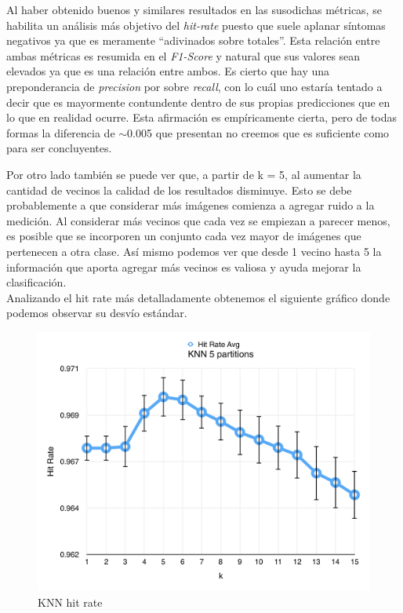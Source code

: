 Al haber obtenido buenos y similares resultados en las susodichas m\'etricas, se habilita un an\'alisis m\'as objetivo del \textit{hit-rate} puesto que suele aplanar s\'intomas negativos ya que es meramente ``adivinados sobre totales''. Esta relaci\'on entre ambas m\'etricas es resumida en el \textit{F1-Score} y  natural que sus valores sean elevados ya que es una relaci\'on entre ambos. Es cierto que hay una preponderancia de \textit{precision} por sobre \textit{recall}, con lo cu\'al uno estar\'ia tentado a decir que es mayormente contundente dentro de sus propias predicciones que en lo que en realidad ocurre. Esta afirmaci\'on es emp\'iricamente cierta, pero de todas formas la diferencia de $\sim$0.005 que presentan no creemos que es suficiente como para ser concluyentes.

Por otro lado también se puede ver que, a partir de k = 5, al aumentar la cantidad de vecinos la calidad de los resultados disminuye. Esto se debe probablemente a que considerar más imágenes comienza a agregar ruido a la medición. Al considerar más vecinos que cada vez se empiezan a parecer menos, es posible que se incorporen un conjunto cada vez mayor de imágenes que pertenecen a otra clase. Así mismo podemos ver que desde 1 vecino hasta 5 la información que aporta agregar más vecinos es valiosa y ayuda mejorar la clasificación.\\

Analizando el hit rate más detalladamente obtenemos el siguiente gráfico donde podemos observar su desvío estándar.

\newpage

\begin{figure}[h!]
  \begin{center}
	\includegraphics[scale=0.7]{exp1/KNN-5p-Hit-Rate.png}
	\caption{KNN hit rate}
  \end{center}
\end{figure}

